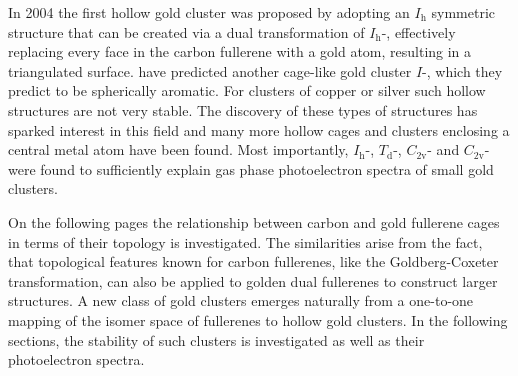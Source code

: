 In 2004 the first hollow gold cluster  was proposed by
\citeauthor{Johansson_Au3224CaratGolden_2004}\autocite{Johansson_Au3224CaratGolden_2004}
adopting an $I_\text{h}$ symmetric structure that can be created via a dual
transformation of $I_\text{h}$-, effectively replacing every face in the
carbon fullerene with a gold atom, resulting in a triangulated surface.
\citeauthor{Karttunen_IcosahedralAu72_2008}\autocite{Karttunen_IcosahedralAu72_2008}
have predicted another cage-like gold cluster $I$-, which they predict
to be spherically aromatic. For clusters of copper or silver such hollow
structures are not very
stable.\autocite{Johansson_Au3224CaratGolden_2004,FERNANDEZ_DENSITYFUNCTIONALSTUDIES_2006}
The discovery of these types of structures has sparked interest in this field
and many more hollow
cages\autocite{Gu-2004,Fernandez-2006,Fa-Dong-2006,Fa-Zhou-2006,Karttunen_IcosahedralAu72_2008,Fa-Luong-2008,Chen_Structuresneutralanionic_2010,Tian-2011,De-2012,Ning-2014,Joshi-2015}
and clusters enclosing a central metal
atom\autocite{Autschbach_PropertiesWAu12_2004,Zhai-2004,Gao-Bulusu-2005,Wang_Dopinggoldencage_2007,Wang_DopingGoldenBuckyballs_2007,Fa-Dong-2008a,Munoz-2013,Manna-2013,Tang-2013}
have been found. Most importantly, $I_\text{h}$-,
$T_\text{d}$-, $C_\text{2v}$- and
$C_\text{2v}$- were found to sufficiently explain gas phase
photoelectron spectra of small gold clusters.\autocite{Ji-2005,Bulusu_Evidencehollowgolden_2006}

On the following pages the relationship between carbon and gold fullerene cages
in terms of their topology is investigated. The similarities arise from the
fact, that topological features known for carbon
fullerenes\autocite{Cataldo-Ori-2011,Schwerdtfeger_topologyfullerenes_2015,Fowler-atlas-2006},
like the Goldberg-Coxeter
transformation,\autocite{Goldberg_ClassMultiSymmetricPolyhedra_1937,Coxeter-1971}
can also be applied to golden dual fullerenes to construct larger structures. A
new class of gold clusters emerges naturally from a one-to-one mapping of the
isomer space of fullerenes to hollow gold clusters. In the following sections,
the stability of such clusters is investigated as well as their photoelectron
spectra. 


